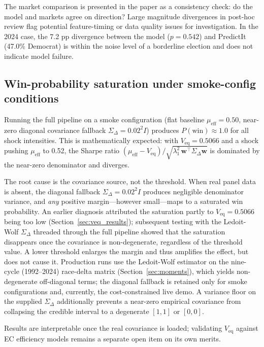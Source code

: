 \documentclass[12pt, letterpaper]{article}
\theoremstyle{definition}
\newcommand{\mueff}{\mu_{\mathrm{eff}}}
\newcommand{\Veq}{V_{\mathrm{eq}}}
\newcommand{\SigmaDelta}{\Sigma_{\Delta}}
\newcommand{\lambdaone}{\lambda_1}
\newcommand{\boldw}{\mathbf{w}}
\begin{document}
The market comparison is presented in the paper as a consistency check: do
the model and markets agree on direction? Large magnitude divergences in
post-hoc review flag potential feature-timing or data quality issues for
investigation. In the 2024 case, the 7.2 pp divergence between the model
($p = 0.542$) and PredictIt (47.0\% Democrat) is within the noise level
of a borderline election and does not indicate model failure.

\subsection{Win-probability saturation under smoke-config conditions}
\label{sec:saturation}

Running the full pipeline on a smoke configuration (flat baseline $\mueff = 0.50$,
near-zero diagonal covariance fallback $\SigmaDelta = 0.02^2 I$) produces
$P(\text{win}) \approx 1.0$ for all shock intensities. This is mathematically
expected: with $\Veq = 0.5066$ and a shock pushing $\mueff$ to 0.52, the
Sharpe ratio $(\mueff - \Veq) / \sqrt{\lambdaone^2\, \boldw^\top \SigmaDelta
\boldw}$ is dominated by the near-zero denominator and diverges.

The root cause is the covariance source, not the threshold. When real panel
data is absent, the diagonal fallback $\SigmaDelta = 0.02^2 I$ produces
negligible denominator variance, and \emph{any} positive margin---however
small---maps to a saturated win probability. An earlier diagnosis attributed
the saturation partly to $\Veq = 0.5066$ being too low
(Section~\ref{sec:veq_results}); subsequent testing with the Ledoit-Wolf
$\SigmaDelta$ threaded through the full pipeline showed that the saturation
disappears once the covariance is non-degenerate, regardless of the threshold
value. A lower threshold enlarges the margin and thus amplifies the effect,
but does not cause it. Production runs use the Ledoit-Wolf estimator on the
nine-cycle (1992--2024) race-delta matrix (Section~\ref{sec:moments}), which
yields non-degenerate off-diagonal terms; the diagonal fallback is retained
only for smoke configurations and, currently, the cost-constrained live demo.
A variance floor on the supplied $\SigmaDelta$ additionally prevents a
near-zero empirical covariance from collapsing the credible interval to a
degenerate $[1,1]$ or $[0,0]$.

Results are interpretable once the real covariance is loaded; validating
$\Veq$ against EC efficiency models remains a separate open item on its own
merits.
\end{document}
